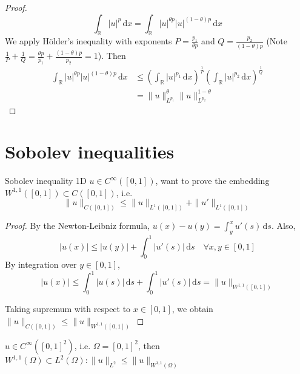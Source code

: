 \documentclass{report}
\begin{document}
\begin{proof}
    \[\int_{\mathbb{R}} \vert u \vert^p \,\mathrm{d}x = \int_{\mathbb{R}} \vert u \vert^{\theta p} \vert u \vert^{(1-\theta) p} \,\mathrm{d}x\]
    We apply Hölder's inequality with exponents \(P = \frac{p_1}{\theta p} \) and \(Q = \frac{p_2}{(1-\theta)p}\) (Note \(\frac{1}{P} + \frac{1}{Q} = \frac{\theta p}{p_1} + \frac{(1-\theta)p}{p_2} = 1\)). Then
    \begin{align*}
        \int_{\mathbb{R}} \vert u \vert^{\theta p} \vert u \vert^{(1-\theta) p} \,\mathrm{d}x &\leq \left(\int_{\mathbb{R}} \vert u \vert^{p_1} \,\mathrm{d}x \right)^{\frac{1}{P}} \left(\int_{\mathbb{R}} \vert u \vert^{p_2} \,\mathrm{d}x \right)^{\frac{1}{Q}} \\
        &= \|u\|_{L^{p_1}}^{\theta} \|u\|_{L^{p_2}}^{1 - \theta}
    \end{align*}
\end{proof}

\section{Sobolev inequalities}

\begin{example}{Sobolev inequality 1D}{}
    \(u \in C^{\infty}([0,1])\), want to prove the embedding \(W^{1, 1}([0,1]) \subset C([0,1])\), i.e.
    \begin{equation}\label{eq:3}
        \|u\|_{C([0,1])} \leq \|u\|_{L^{1}([0,1])} + \|u'\|_{L^{1}([0,1])}
    \end{equation}
\end{example}

\begin{proof}
    By the Newton-Leibniz formula, \(u(x) - u(y) = \int_{y}^{x} u'(s) \,\mathrm{d}s\). Also,
    \[|u(x)| \leq |u(y)| + \int_{0}^{1} |u'(s)| \,\mathrm{d}s \quad \forall x, y \in [0,1]\]
    By integration over \(y \in [0,1]\), 
    \[|u(x)| \leq \int_{0}^{1} |u(s)| \,\mathrm{d}s + \int_{0}^{1} |u'(s)| \,\mathrm{d}s = \|u\|_{W^{1, 1}([0, 1])}\]

    Taking supremum with respect to \(x \in [0,1]\), we obtain \(\|u\|_{C([0,1])} \leq \|u\|_{W^{1, 1}([0, 1])}\)
\end{proof}

{
    \(u \in C^{\infty}([0,1]^2)\), i.e. \(\Omega = [0,1]^2\), then \(W^{1, 1}(\Omega) \subset L^{2}(\Omega) : \|u\|_{L^{2}} \leq \|u\|_{W^{1, 1}(\Omega)}\)
}
\end{document}
